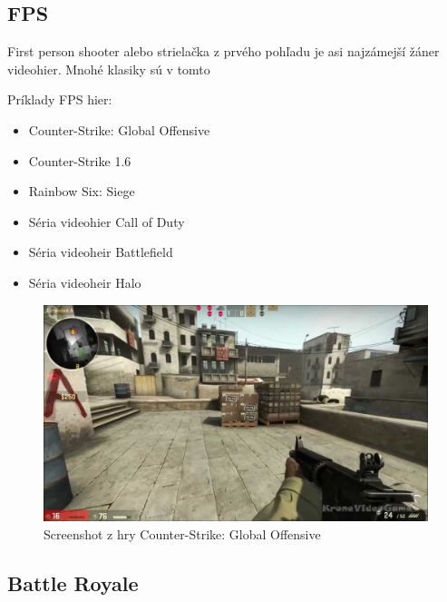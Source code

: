 \documentclass[10pt,twoside,slovak,a4paper]{article}
\begin{document}
\subsection{FPS} \label{zanre:fps}

First person shooter alebo strielačka z prvého pohľadu je asi najzámejší žáner videohier. Mnohé klasiky sú v tomto 

Príklady FPS hier:
\begin{itemize}
\item Counter-Strike: Global Offensive
\item Counter-Strike 1.6
\item Rainbow Six: Siege
\item Séria videohier Call of Duty
\item Séria videoheir Battlefield
\item Séria videoheir Halo
\end{itemize}

\begin{figure}[tbh]
\centering
\includegraphics[scale=0.2]{csgo.jpg}
\caption{Screenshot z hry Counter-Strike: Global Offensive}
\label{f:csgo}
\end{figure}

\subsection{Battle Royale} \label{zanre:battleroyale}
\end{document}

